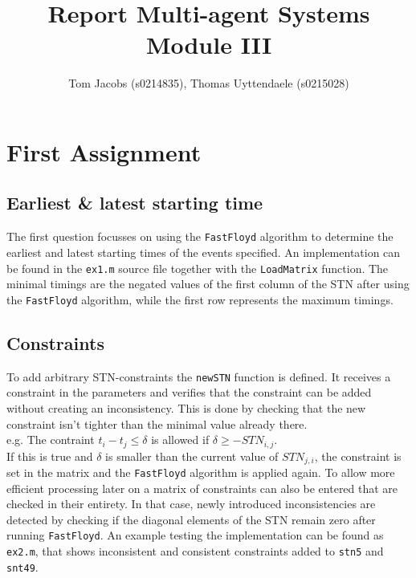 \documentclass[10pt,a4paper]{article}
\title{Report Multi-agent Systems Module III}
\author{Tom Jacobs (s0214835), Thomas Uyttendaele (s0215028)}
\begin{document}
\maketitle
\tableofcontents

\section{First Assignment}
\subsection{Earliest \& latest starting time}
The first question focusses on using the \texttt{FastFloyd} algorithm to determine the earliest and latest starting times of the events specified. An implementation can be found in the \texttt{ex1.m} source file together with the \texttt{LoadMatrix} function. The minimal timings are the negated values of the first column of the STN after using the \texttt{FastFloyd} algorithm, while the first row represents the maximum timings.

\subsection{Constraints}
\label{sec:constraints}
To add arbitrary STN-constraints the \texttt{newSTN} function is defined. It receives a constraint in the parameters and verifies that the constraint can be added without creating an inconsistency. This is done by checking that the new constraint isn't tighter than the minimal value already there. \\
e.g. The contraint $t_i - t_j \leq \delta$ is allowed if $\delta \geq -STN_{i,j}$.
\\If this is true and $\delta$ is smaller than the current value of $STN_{j,i}$, the constraint is set in the matrix and the \texttt{FastFloyd} algorithm is applied again. To allow more efficient processing later on a matrix of constraints can also be entered that are checked in their entirety. In that case, newly introduced inconsistencies are detected by checking if the diagonal elements of the STN remain zero after running \texttt{FastFloyd}. An example testing the implementation can be found as \texttt{ex2.m}, that shows inconsistent and consistent constraints added to \texttt{stn5} and \texttt{snt49}.
\end{document}

